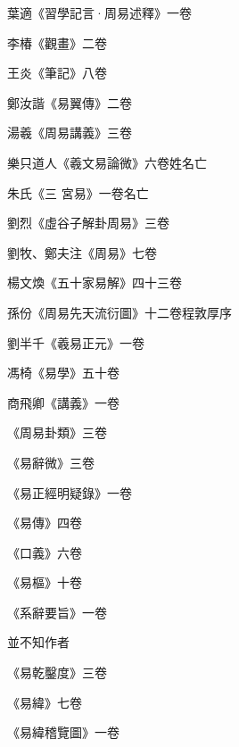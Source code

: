 \begin{pinyinscope}
 葉適《習學記言·周易述釋》一卷



 李椿《觀畫》二卷



 王炎《筆記》八卷



 鄭汝諧《易翼傳》二卷



 湯羲《周易講義》三卷



 樂只道人《羲文易論微》六卷姓名亡



 朱氏《三
 宮易》一卷名亡



 劉烈《虛谷子解卦周易》三卷



 劉牧、鄭夫注《周易》七卷



 楊文煥《五十家易解》四十三卷



 孫份《周易先天流衍圖》十二卷程敦厚序



 劉半千《羲易正元》一卷



 馮椅《易學》五十卷



 商飛卿《講義》一卷



 《周易卦類》三卷



 《易辭微》三卷



 《易正經明疑錄》一卷



 《易傳》四卷



 《口義》六卷



 《易樞》十卷



 《系辭要旨》一卷



 並不知作者



 《易乾鑿度》三卷



 《易緯》七卷



 《易緯稽覽圖》一卷




\end{pinyinscope}
